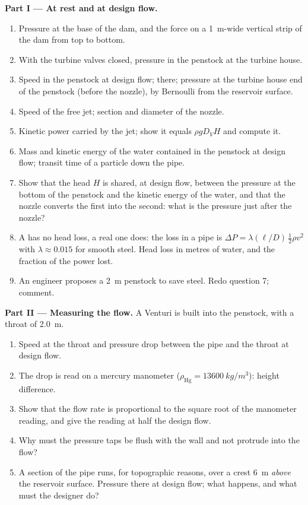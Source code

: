 \begin{problem}
\medskip
\noindent\textbf{Part I --- At rest and at design flow.}
\begin{enumerate}
  \item Pressure at the base of the dam, and the force on a
        \qty{1}{m}-wide vertical strip of the dam from top to bottom.
  \item With the turbine valves closed, pressure in the penstock at the
        turbine house.
  \item Speed in the penstock at design flow;  there;
        pressure at the turbine house end of the penstock (before the
        nozzle), by Bernoulli from the reservoir surface.
  \item Speed of the free jet; section and diameter of the nozzle.
  \item Kinetic power carried by the jet; show it equals $\rho gD_VH$
        and compute it.
  \item Mass and kinetic energy of the water contained in the penstock
        at design flow; transit time of a particle down the pipe.
  \item Show that the head $H$ is shared, at design flow, between the
        pressure at the bottom of the penstock and the kinetic energy
        of the water, and that the nozzle converts the first into the
        second: what is the pressure just after the nozzle?
  \item A  has no head loss, a real one does: the loss in
        a pipe is $\Delta P = \lambda(\ell/D)\,\tfrac12\rho v^2$ with $\lambda
        \approx 0.015$ for smooth steel. Head loss in metres of water, and
        the fraction of the power lost.
  \item An engineer proposes a \qty{2}{m} penstock to save steel. Redo
        question 7; comment.
\end{enumerate}

\medskip
\noindent\textbf{Part II --- Measuring the flow.}
A Venturi is built into the penstock, with a throat of \qty{2.0}{m}.
\begin{enumerate}[resume]
  \item Speed at the throat and pressure drop between the pipe and the
        throat at design flow.
  \item The drop is read on a mercury manometer ($\rho_{\text{Hg}} =
        \qty{13600}{kg/m^3}$): height difference.
  \item Show that the flow rate is proportional to the square root of
        the manometer reading, and give the reading at half the design
        flow.
  \item Why must the pressure taps be flush with the wall and not
        protrude into the flow?
  \item A section of the pipe runs, for topographic reasons, over a
        crest \qty{6}{m} \emph{above} the reservoir surface. Pressure there
        at design flow; what happens, and what must the designer do?
\end{enumerate}


\end{problem}
